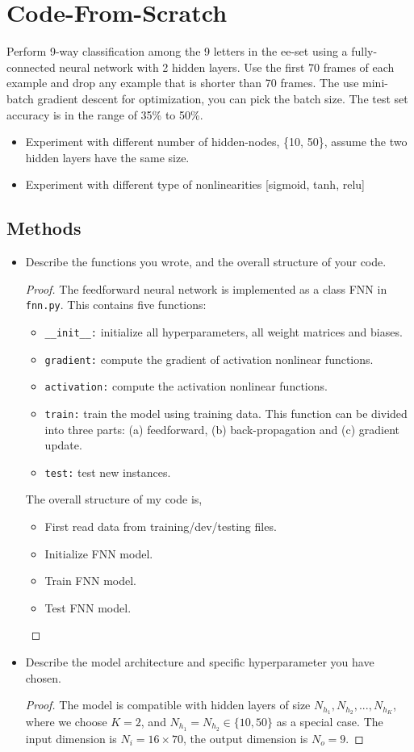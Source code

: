 \documentclass[11pt]{article}
\newcommand{\1}{\mathbf{1}}
\begin{document}
{\section{Code-From-Scratch}
Perform 9-way classification among the 9 letters in the ee-set using a fully-connected neural network with 2 hidden layers. Use the first 70 frames of each example and drop any example that is shorter than 70 frames. The use mini-batch gradient descent for optimization, you can pick the batch size. The test set accuracy is in the range of 35\% to 50\%.
\begin{itemize}
  \item Experiment with different number of hidden-nodes, \{10, 50\}, assume the two hidden layers have the same size.
  \item Experiment with different type of nonlinearities [sigmoid, tanh, relu]
\end{itemize}
\subsection{Methods}
\begin{itemize}
  \item Describe the functions you wrote, and the overall structure of your code.
  \begin{proof}
    The feedforward neural network is implemented as a class FNN in {\tt fnn.py}. This contains five functions:
    \begin{itemize}
      \item {\tt \_\_init\_\_:} initialize all hyperparameters, all weight matrices and biases.
      \item {\tt gradient:} compute the gradient of activation nonlinear functions.
      \item {\tt activation:} compute the activation nonlinear functions.
      \item {\tt train:} train the model using training data. This function can be divided into three parts: (a) feedforward, (b) back-propagation and (c) gradient update. 
      \item {\tt test:} test new instances.
    \end{itemize}
    The overall structure of my code is,
    \begin{itemize}
      \item First read data from training/dev/testing files.
      \item Initialize FNN model.
      \item Train FNN model.
      \item Test FNN model.
    \end{itemize}
  \end{proof}
  \item Describe the model architecture and specific hyperparameter you have chosen.
  \begin{proof}
    The model is compatible with hidden layers of size $N_{h_1}, N_{h_2},...,N_{h_K}$, where we choose $K=2$, and $N_{h_1} = N_{h_2} \in \{10, 50\}$ as a special case. The input dimension is $N_i = 16\times70$, the output dimension is $N_o = 9$. 


\end{proof}
\end{itemize}}
\end{document}
